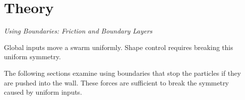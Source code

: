 \section{Theory}
\label{sec:theory}

\emph{Using Boundaries: Friction and Boundary Layers}\label{subsec:WallFriction}

Global inputs move a swarm uniformly.  
Shape control requires breaking this uniform symmetry.

The following sections examine using boundaries that stop the particles if they are pushed into the wall.
 These forces are  sufficient to break the symmetry caused by uniform inputs.  